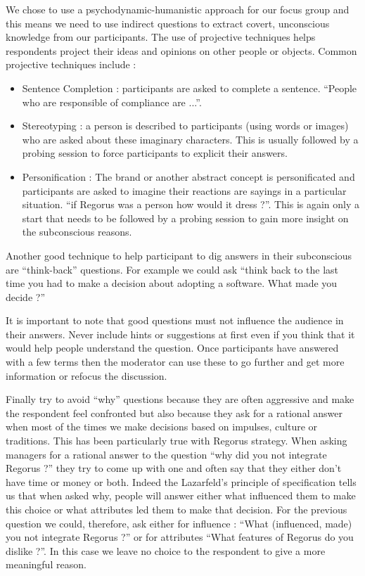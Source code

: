 \documentclass[10pt]{report}
\begin{document}
We chose to use a psychodynamic-humanistic approach for our focus group and this means we need to use indirect questions to extract covert, unconscious knowledge from our participants. The use of projective techniques helps respondents project their ideas and opinions on other people or objects. Common projective techniques include : 
\begin{itemize}
\item Sentence Completion : participants are asked to complete a sentence. \enquote{People who are responsible of compliance are ...}.
\item Stereotyping : a person is described to participants (using words or images) who are asked about these imaginary characters. This is usually followed by a probing session to force participants to explicit their answers.
\item Personification : The brand or another abstract concept is personificated and participants are asked to imagine their reactions are sayings in a particular situation. \enquote{if Regorus was a person how would it dress ?}. This is again only a start that needs to be followed by a probing session to gain more insight on the subconscious reasons.
\end{itemize}

Another good technique to help participant to dig answers in their subconscious are \enquote{think-back} questions. For example we could ask \enquote{think back to the last time you had to make a decision about adopting a software. What made you decide ?}

It is important to note that good questions must not influence the audience in their answers. Never include hints or suggestions at first even if you think that it would help people understand the question. Once participants have answered with a few terms then the moderator can use these to go further and get more information or refocus the discussion.

Finally try to avoid \enquote{why} questions because they are often aggressive and make the respondent feel confronted but also because they ask for a rational answer when most of the times we make decisions based on impulses, culture or traditions. This has been particularly true with Regorus strategy. When asking managers for a rational answer to the question \enquote{why did you not integrate Regorus ?} they try to come up with one and often say that they either don't have time or money or both. Indeed the Lazarfeld's principle of specification \autocite{Lazarfeld1935} tells us that when asked why, people will answer either what influenced them to make this choice or what attributes led them to make that decision. For the previous question we could, therefore, ask either for influence : \enquote{What (influenced, made) you not integrate Regorus ?} or for attributes \enquote{What features of Regorus do you dislike ?}. In this case we leave no choice to the respondent to give a more meaningful reason.
\end{document}
